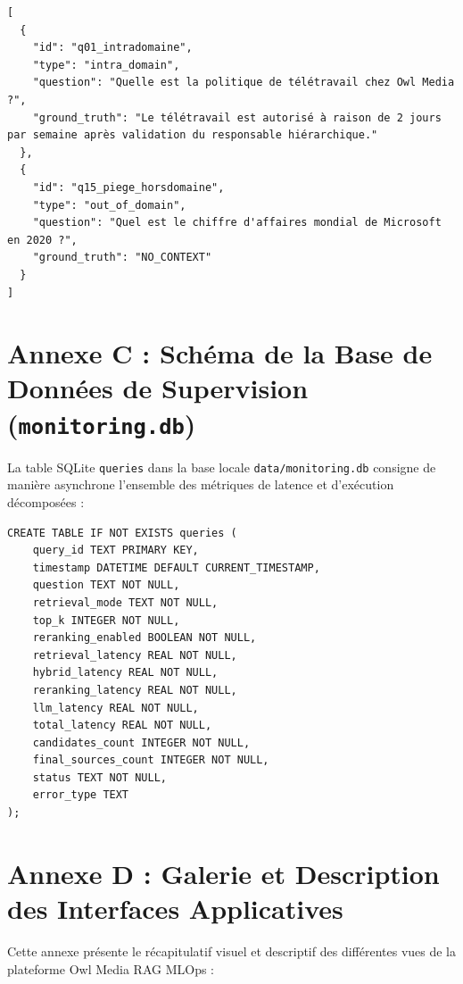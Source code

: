 \begin{verbatim}
[
  {
    "id": "q01_intradomaine",
    "type": "intra_domain",
    "question": "Quelle est la politique de télétravail chez Owl Media ?",
    "ground_truth": "Le télétravail est autorisé à raison de 2 jours par semaine après validation du responsable hiérarchique."
  },
  {
    "id": "q15_piege_horsdomaine",
    "type": "out_of_domain",
    "question": "Quel est le chiffre d'affaires mondial de Microsoft en 2020 ?",
    "ground_truth": "NO_CONTEXT"
  }
]
\end{verbatim}

\clearpage

\section*{Annexe C : Schéma de la Base de Données de Supervision (\texttt{monitoring.db})}
La table SQLite \texttt{queries} dans la base locale \texttt{data/monitoring.db} consigne de manière asynchrone l'ensemble des métriques de latence et d'exécution décomposées :

\begin{verbatim}
CREATE TABLE IF NOT EXISTS queries (
    query_id TEXT PRIMARY KEY,
    timestamp DATETIME DEFAULT CURRENT_TIMESTAMP,
    question TEXT NOT NULL,
    retrieval_mode TEXT NOT NULL,
    top_k INTEGER NOT NULL,
    reranking_enabled BOOLEAN NOT NULL,
    retrieval_latency REAL NOT NULL,
    hybrid_latency REAL NOT NULL,
    reranking_latency REAL NOT NULL,
    llm_latency REAL NOT NULL,
    total_latency REAL NOT NULL,
    candidates_count INTEGER NOT NULL,
    final_sources_count INTEGER NOT NULL,
    status TEXT NOT NULL,
    error_type TEXT
);
\end{verbatim}

\clearpage

\section*{Annexe D : Galerie et Description des Interfaces Applicatives}
Cette annexe présente le récapitulatif visuel et descriptif des différentes vues de la plateforme Owl Media RAG MLOps :

